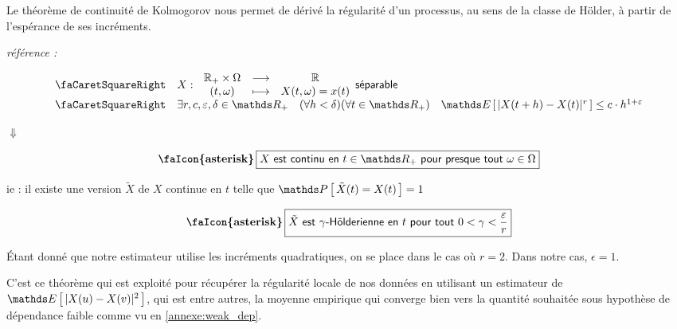 Le théorème de continuité de Kolmogorov nous permet de dérivé la régularité d'un processus, au sens de la classe de Hölder, à partir de l'espérance de ses incréments.

\begin{thm}
	\emph{référence : } ~\cite[thm : 2.197 | page : 145]{capasso2015introduction}

	\begin{equation*}
		\begin{array}{ll}
			\textsf{\faCaretSquareRight}
			 & X : \, \begin{array}{ccc}
				          \mathbb{R_+} \times \Omega & \longrightarrow & \mathbb{R}          \\
				          (t, \omega)                & \longmapsto     & X(t, \omega) = x(t)
			          \end{array} \textsf{séparable}
			\\
			\textsf{\faCaretSquareRight}
			 & \exists r,c, \varepsilon, \delta \in \mathds R_+ \quad (\forall h < \delta)(\forall t \in \mathds R_+)  \quad \esperance{ | X(t+h) - X(t) |^r } \leq c\cdot h^{1+\varepsilon}
		\end{array}
	\end{equation*}

	\begin{center}
		$\Downarrow$
	\end{center}
	\begin{equation*}
		\textbf{\faIcon{asterisk}}\, \boxed{
			X \textsf{ est continu en } t \in \mathds R_+ \textsf{ pour presque tout } \omega \in \Omega
		}
	\end{equation*}
	\begin{center}
		ie : il existe une version $\tilde X$ de $X$ continue en $t$ telle que $\proba{ \tilde X(t) = X(t)} = 1$
	\end{center}

	\begin{equation*}
		\textbf{\faIcon{asterisk}} \, \boxed{
			\tilde{X} \textsf{ est } \gamma \textsf{-Hölderienne en } t  \textsf{ pour tout } 0 < \gamma < \frac{\varepsilon}{r}
		}
	\end{equation*}
	\label{thm:kolmogorov_continuite}
\end{thm}

Étant donné que notre estimateur utilise les incréments quadratiques, on se place dans le cas où $r = 2$. Dans notre cas, $\epsilon = 1$.

\largeskip

C'est ce théorème qui est exploité pour récupérer la régularité locale de nos données en utilisant un estimateur de $\esperance{ |X(u) - X(v)|^2}$, qui est entre autres, la moyenne empirique qui converge bien vers la quantité souhaitée sous hypothèse de dépendance faible comme vu en \ref{annexe:weak_dep}.